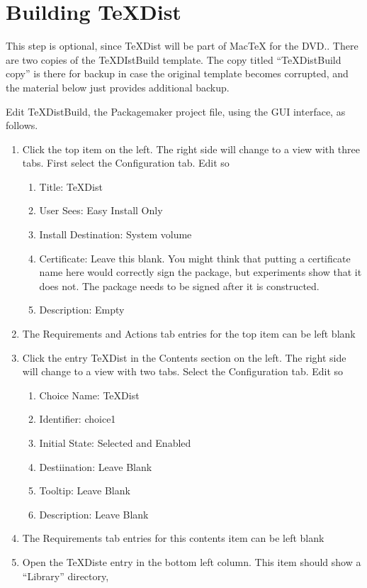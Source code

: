 \documentclass[11pt, oneside]{amsart}
\begin{document}
\section{Building TeXDist}

This step is optional, since TeXDist will be part of MacTeX for the DVD.. There are two copies of the TeXDIstBuild template. The copy
titled ``TeXDistBuild copy'' is there for backup in case the original template becomes corrupted, and the
material below just provides additional backup.

Edit TeXDistBuild, the Packagemaker project file, using the GUI interface, as follows.

\begin{enumerate}
\item Click the top item on the left. The right side will change to a view with three tabs. First select
the Configuration tab. Edit so
\begin{enumerate}
\item Title: TeXDist
\item User Sees: Easy Install Only
\item Install Destination: System volume
\item Certificate: Leave this blank. You might think that putting a certificate name here would correctly sign
the package, but experiments show that it does not. The package needs to be signed after it is constructed.
\item Description: Empty
\end{enumerate}
\item The Requirements and Actions tab entries for the top item can be left blank
\item Click the entry TeXDist in the Contents section on the left. The right side will change to a view with two tabs.
Select the Configuration tab. Edit so
\begin{enumerate}
\item Choice Name: TeXDist
\item Identifier: choice1
\item Initial State: Selected and Enabled
\item Destiination: Leave Blank
\item Tooltip: Leave Blank
\item Description: Leave Blank
\end{enumerate}
\item The Requirements tab entries for this contents item can be left blank
\item Open the TeXDiste  entry in the bottom left column. This item should show a ``Library'' directory,

\end{enumerate}
\end{document}
